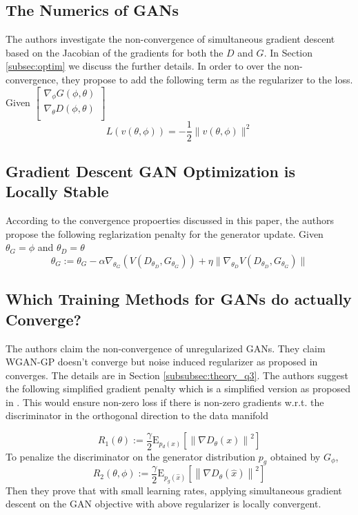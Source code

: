 \subsection*{The Numerics of GANs \citep{geiger06}} The authors investigate the non-convergence of simultaneous gradient descent based on the Jacobian of the gradients for both the $D$ and $G$. In Section \ref{subsec:optim} we discuss the further details. In order to over the non-convergence, they propose to add the following term as the regularizer to the loss. Given $ \begin{bmatrix}
\nabla_{\phi} G(\phi, \theta) \\
\nabla_{\theta} D(\phi, \theta) \\
\end{bmatrix}$
$$L(v(\theta, \phi)) = - \frac{1}{2} \parallel v(\theta, \phi) \parallel^2  $$
\subsection*{Gradient Descent GAN Optimization is Locally Stable \citep{CMU17}}
According to the convergence propoerties discussed in this paper, the authors propose the following reglarization penalty for the generator update.  Given $\theta_G = \phi$ and $\theta_D = \theta$ 
$$\theta_{G} := \theta_{G} - \alpha \nabla_{\theta_{G}} (V(D_{\theta_{D}}, G_{\theta_{G}})) + \eta \parallel \nabla_{\theta_{D}} V(D_{\theta_{D}}, G_{\theta_{G}}) \parallel $$
\subsection*{Which Training Methods for GANs do actually Converge? \citep{mescheder18icml}}

The authors claim the non-convergence of unregularized GANs. They claim WGAN-GP doesn't converge but noise induced regularizer as proposed in \citep{fgan_2} converges. The details are in Section \ref{subsubsec:theory_q3}. The authors suggest the following simplified gradient
penalty which is a simplified version as proposed in \citep{fgan_2}. This would ensure non-zero loss if there is non-zero gradients w.r.t. the discriminator in the orthogonal direction to the data manifold 

\begin{equation}
    R_{1}(\theta) :=\frac{\gamma}{2} \mathrm{E}_{p_d (x)}\left[\left\|\nabla D_{\theta}(x)\right\|^{2}\right]
\end{equation}{}
 To penalize the discriminator on the generator distribution $p_g$ obtained by $G_{\phi}$,
 \begin{equation}
R_{2}(\theta, \phi) :=\frac{\gamma}{2} \mathrm{E}_{p_g(\hat{x})}\left[\left\|\nabla D_{\theta}(\hat{x})\right\|^{2}\right]
\end{equation}  
Then they prove that with small learning rates, applying simultaneous gradient descent on the GAN objective with above regularizer is locally convergent.
